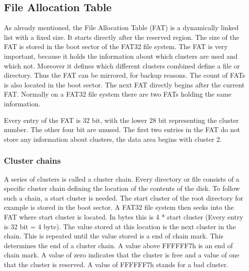 \subsection{File Allocation Table}

As already mentioned, the File Allocation Table (FAT) is a dynamically linked list with a fixed size. It starts directly after the reserved region. The size of the FAT is stored in the boot sector of the FAT32 file system. The FAT is very important, because it holds the information about which clusters are used and which not. Moreover it defines which different clusters combined define a file or directory. Thus the FAT can be mirrored, for backup reasons. The count of FATs is also located in the boot sector. The next FAT directly begins after the current FAT. Normally on a FAT32 file system there are two FATs holding the same information.

Every entry of the FAT is 32 bit, with the lower 28 bit representing the cluster number. The other four bit are unused. The first two entries in the FAT do not store any information about clusters, the data area begins with cluster 2.

\subsubsection{Cluster chains}

A series of clusters is called a cluster chain. Every directory or file consists of a specific cluster chain defining the location of the contents of the disk. To follow such a chain, a start cluster is needed. The start cluster of the root directory for example is stored in the boot sector. A FAT32 file system then seeks into the FAT where start cluster is located. In bytes this is 4 * start cluster (Every entry is 32 bit = 4 byte). The value stored at this location is the next cluster in the chain. This is repeated until the value stored is a end of chain mark. This determines the end of a cluster chain. A value above FFFFFF7h is an end of chain mark. A value of zero indicates that the cluster is free and a value of one that the cluster is reserved. A value of FFFFFF7h stands for a bad cluster.

